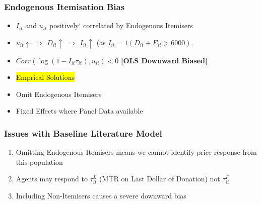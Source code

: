 \documentclass[options]{beamer}
\begin{document}
				
\begin{frame}
	\frametitle{Endogenous Itemisation Bias}
	\begin{itemize}


\item[]  $I_{it}$ and $u_{it}$ positively` correlated by Endogenous Itemisers
\vspace{15pt}
\item[] $u_{it}\uparrow$ $\Rightarrow$ $D_{it}\uparrow$ $\Rightarrow$ $I_{it} \uparrow$ (as $I_{it}=1(D_{it}+E_{it}>6000)$.
\vspace{15pt}
\item[] $Corr(\log(1-I_{it}\tau_{it}),u_{it})<0$ \textbf{[OLS Downward Biased]}
\vspace{15pt}

\item[]\colorbox{yellow}{Emprical Solutions}

\item Omit Endogenous Itemisers
\vspace{5pt}
\item  Fixed Effects where Panel Data available



\end{itemize}

\end{frame}

\begin{frame}
	\frametitle{Issues with Baseline Literature Model}

\begin{enumerate}
	\item Omitting Endogenous Itemisers means we cannot identify price response from this population
	\vspace{15pt}
	\item Agents may respond to $\tau_{it}^L$ (MTR on Last Dollar of Donation) not $\tau_{it}^F$
	\vspace{15pt}
	\item Including Non-Itemisers causes a severe downward bias
	 	
	 \end{enumerate}



\end{frame}
	
\end{document}
